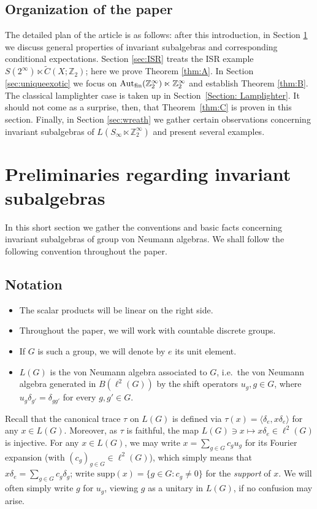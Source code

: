 \documentclass[11pt]{amsart}
\newcommand{\Z}{\mathbb Z}
\newcommand{\Aut}{\textup{Aut}}
\theoremstyle{plain}
\theoremstyle{definition}
\theoremstyle{remark}
\numberwithin{equation}{section}
\begin{document}
\subsection*{Organization of the paper}The detailed plan of the article is as follows: after this introduction, in Section \ref{sec:prelim} we discuss general properties of invariant subalgebras and corresponding conditional expectations. Section \ref{sec:ISR} treats the ISR  example 
$S(2^\infty) \ltimes \tilde{C}(X; \mathbb Z_2)$; here we prove Theorem \ref{thm:A}. In Section \ref{sec:uniqueexotic} we focus on $\Aut_{\textup{fin}}(\Z_2^\infty) \ltimes \Z_2^\infty$ and establish Theorem \ref{thm:B}. The classical lamplighter case is taken up in Section~\ref{Section: Lamplighter}. It should not come as a surprise, then, that Theorem~\ref{thm:C} is proven in this section. Finally, in Section \ref{sec:wreath} we gather certain observations concerning invariant subalgebras of $L(S_\infty\ltimes \Z_2^\infty)$ and present several examples.



\section{Preliminaries regarding invariant subalgebras} \label{sec:prelim}
In this short section we gather the conventions and basic facts concerning invariant subalgebras of group von Neumann algebras. We shall follow the following convention throughout the paper. 
\subsection*{Notation}
\begin{itemize}
    \item The scalar products will be linear on the right side.
    \item Throughout the paper, we will work with countable discrete groups.
   \item If $G$ is such a group, we will denote by $e$ its unit element.
   \item $L(G)$ is the von Neumann algebra associated to $G$, i.e.\ the von Neumann algebra generated in $B(\ell^2(G))$ by the shift operators $u_g, g \in G$, where $u_g \delta_{g'} = \delta_{gg'}$ for every $g,g' \in G$.
\end{itemize}
Recall that the canonical trace $\tau$ on $L(G)$ is defined via $\tau(x)=\langle \delta_e,x\delta_e\rangle$ for any $x\in L(G)$. Moreover, as $\tau$ is faithful, the map $L(G)\ni x\mapsto x\delta_e\in \ell^2(G)$ is injective. 
For any $x\in L(G)$, we may write $x=\sum_{g\in G}c_gu_g$ for its Fourier expansion (with $(c_g)_{g\in G}\in\ell^2(G)$), which simply means that $x\delta_e=\sum_{g\in G}c_g\delta_g$;
write $\text{supp}(x)=\{g\in G: c_g\neq 0\}$ for the \emph{support} of $x$. We will often simply write $g$ for $u_g$, viewing $g$ as a unitary in $L(G)$, if no confusion may arise.
\end{document}
